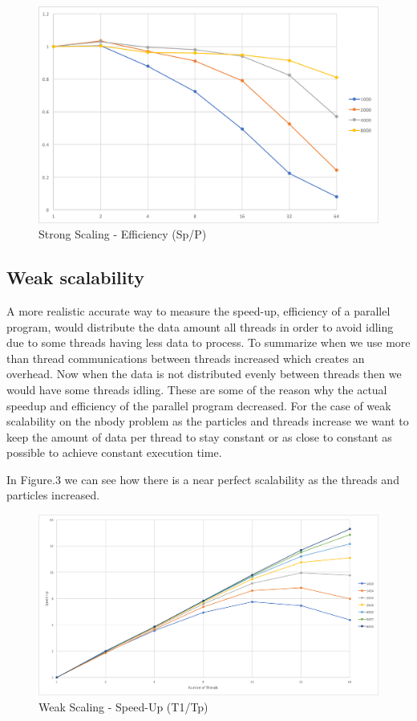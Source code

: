 \documentclass[12pt]{article} %
\begin{document}
\begin{figure}[htb]
\caption{Strong Scaling - Efficiency (Sp/P)}\label{fig:benchmark01}
\centering
\includegraphics[width=\textwidth,keepaspectratio]{imgs/img02.png}
\end{figure} 

\newpage

\subsection{Weak scalability}

A more realistic accurate way to measure the speed-up, efficiency of a parallel program, would distribute the data amount all threads in order to avoid idling due to some threads having less data to process. To summarize when we use more than thread communications between threads increased which creates an overhead. Now when the data is not distributed evenly between threads then we would have some threads idling. These are some of the reason why the actual speedup and efficiency of the parallel program decreased. For the case of weak scalability on the nbody problem as the particles and threads increase we want to keep the amount of data per thread to stay constant or as close to constant as possible to achieve constant execution time. 

In Figure.3 we can see how there is a near perfect scalability as the threads and particles increased.

\begin{figure}[htb]
\caption{Weak Scaling - Speed-Up (T1/Tp)}\label{fig:benchmark02}
\centering
\includegraphics[width=\textwidth,keepaspectratio]{imgs/img03.png}
\end{figure}
\end{document}
